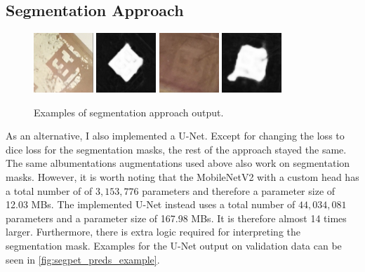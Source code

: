 \documentclass[10pt]{book}
\newcommand{\figureref}[1]{\autoref{#1}}
\begin{document}
\subsection{Segmentation Approach}

\begin{figure}
  \centering
     {\includegraphics[width=0.2\textwidth]{image/segpet_1_in}}
     {\includegraphics[width=0.2\textwidth]{image/segpet_1_pred}}
     {\includegraphics[width=0.2\textwidth]{image/segpet_3_in}}
     {\includegraphics[width=0.2\textwidth]{image/segpet_3_pred}}
  \caption{Examples of segmentation approach output.}
  \label{fig:segpet_preds_example}
\end{figure}

As an alternative, I also implemented a U-Net. Except for changing the loss to dice loss for the segmentation masks, the rest of the approach stayed the same. The same albumentations augmentations used above also work on segmentation masks. However, it is worth noting that the MobileNetV2 with a custom head has a total number of of $3,153,776$ parameters and therefore a parameter size of 12.03 \acp{MB}. The implemented U-Net instead uses a total number of $44,034,081$ parameters and a parameter size of 167.98 \acp{MB}. It is therefore almost 14 times larger. Furthermore, there is extra logic required for interpreting the segmentation mask. 
Examples for the U-Net output on validation data can be seen in \figureref{fig:segpet_preds_example}. 
\end{document}

